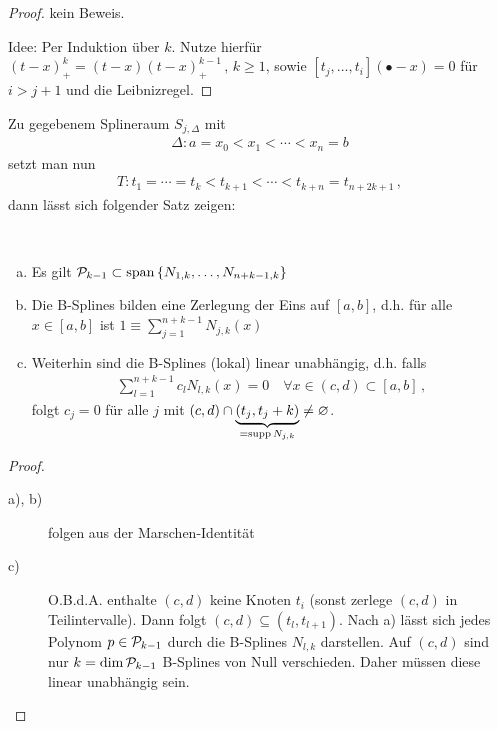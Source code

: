 \begin{proof}
  kein Beweis.

  Idee: Per Induktion über $k$. Nutze hierfür
  $(t-x)_{+}^k = (t-x)(t-x)_{+}^{k-1}\,,\, k \geq 1$,
  sowie $[t_j , \dotsc, t_i]( \bullet - x) = 0$ 
  für $i > j+1$ und die Leibnizregel.
\end{proof}

Zu gegebenem Splineraum $S_{j,\Delta}$ mit
\begin{gather}
  \Delta\colon a=x_0 < x_1 < \dotsm < x_n = b
  \label{VI.2.6}
\end{gather}
setzt man nun 
\begin{gather}
  T: t_1 = \dotsm = t_k < t_{k+1} < \dotsm < t_{k+n} =
  t_{n+2k+1}\, ,
  \label{VI.2.7}
\end{gather} 
dann lässt sich folgender Satz zeigen:




\begin{Satze}\label{6.2.10}~
  \begin{enumerate}[a)]
  \item Es gilt 
    $\mathcal{P}_{k-1}\subset
    \operatorname{span}\left\{N_{1,k}, \dotsc, N_{n+k-1,k}\right\}$
  \item Die B-Splines bilden eine Zerlegung der Eins auf $[a,b]$,
    d.h. für alle $x\in[a,b]$ ist $1\equiv \sum_{j=1}^{n+k-1}N_{j,k}(x)$
  \item Weiterhin sind die B-Splines (lokal) linear unabhängig,
    d.h. falls
    \begin{gather*}
      \sum_{l=1}^{n+k-1}c_lN_{l,k}(x)=0 
      \quad\forall x\in(c,d)\subset [a,b]\,,
    \end{gather*}
    folgt $c_j=0$ für alle $j$ mit 
    $(c,d)\cap \underbrace{(t_j,t_j+k)}_{=\operatorname{supp} N_{j,k}}\neq \varnothing$.
    \label{im6.2.10}
  \end{enumerate}

  \begin{proof}~
    \begin{description}
    \item[a), b)] folgen aus der Marschen-Identität 
      \cite[siehe z.B.][]{deuflhardhohmann}
    \item[c)] O.B.d.A. enthalte $(c,d)$ keine Knoten $t_i$
      (sonst zerlege $(c,d)$ in Teilintervalle).
      Dann folgt $(c,d)\subseteq (t_l, t_{l+1})$.
      Nach a) lässt sich jedes Polynom $p\in \mathcal{P}_{k-1}$
      durch die B-Splines $N_{l,k}$ darstellen.
      Auf $(c,d)$ sind nur $k=\dim\mathcal{P}_{k-1}$
      B-Splines von Null verschieden.
      Daher müssen diese linear unabhängig sein.
    \end{description}
  \end{proof}
\end{Satze}

